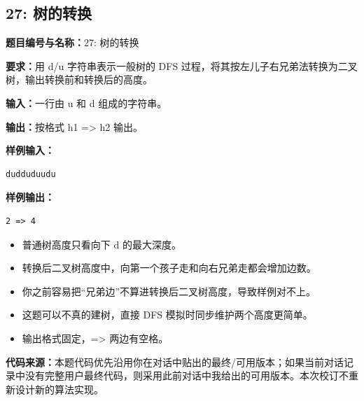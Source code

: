 \documentclass[10pt,a4paper,fontset=none]{ctexart}
\newcommand{\codesource}{\par\noindent\textbf{代码来源：}本题代码优先沿用你在对话中贴出的最终/可用版本；如果当前对话记录中没有完整用户最终代码，则采用此前对话中我给出的可用版本。本次校订不重新设计新的算法实现。\par\vspace{0.2em}}
\begin{document}
\subsection{27: 树的转换}
\begin{taskbox}
\textbf{题目编号与名称：}27: 树的转换\par
\textbf{要求：}用 d/u 字符串表示一般树的 DFS 过程，将其按左儿子右兄弟法转换为二叉树，输出转换前和转换后的高度。\par
\textbf{输入：}一行由 u 和 d 组成的字符串。\par
\textbf{输出：}按格式 h1 => h2 输出。\par
\textbf{样例输入：}
\begin{lstlisting}[style=sample]
dudduduudu
\end{lstlisting}
\textbf{样例输出：}
\begin{lstlisting}[style=sample]
2 => 4
\end{lstlisting}
\end{taskbox}
\begin{mistakebox}
\begin{itemize}
  \item 普通树高度只看向下 d 的最大深度。
  \item 转换后二叉树高度中，向第一个孩子走和向右兄弟走都会增加边数。
  \item 你之前容易把“兄弟边”不算进转换后二叉树高度，导致样例对不上。
  \item 这题可以不真的建树，直接 DFS 模拟时同步维护两个高度更简单。
  \item 输出格式固定，=> 两边有空格。
\end{itemize}
\end{mistakebox}
\codesource
\end{document}
